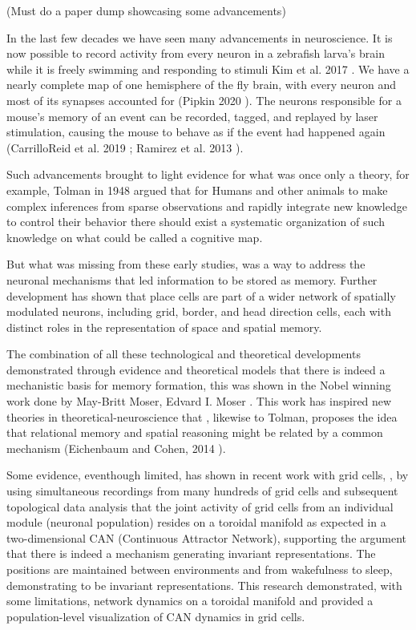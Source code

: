 \documentclass{article}
\begin{document}
(Must do a paper dump showcasing some advancements)

In the last few decades we have seen many advancements in neuroscience. It is now possible to record activity from every neuron in a zebrafish larva’s brain while it is freely swimming and responding to stimuli Kim et al. 2017 \cite{kim2017pan}. We have a nearly complete map of one hemisphere of the fly brain, with every neuron and most of its synapses accounted for (Pipkin 2020 \cite{pipkin2020mapping}). The neurons responsible for a mouse’s memory of an event can be recorded, tagged, and replayed by laser stimulation, causing the mouse to behave as if the event had happened again (CarrilloReid et al. 2019 \cite{carrillo2019controlling}; Ramirez et al. 2013 \cite{ramirez2013creating}).

Such advancements brought to light evidence for what was once only a theory, for example, Tolman in 1948 \cite{tolman1948cognitive} argued that for Humans and other animals to make complex inferences from sparse observations and rapidly integrate new knowledge to control their behavior there should exist a systematic organization of such knowledge on what could be called a cognitive map. 

But what was missing from these early studies, was a way to address the neuronal mechanisms that led information to be stored as memory. Further development has shown that place cells are part of a wider network of spatially modulated neurons, including grid, border, and head direction cells, each with distinct roles in the representation of space and spatial memory.

The combination of all these technological and theoretical developments demonstrated through evidence and theoretical models that there is indeed a mechanistic basis for memory formation, this was shown in the Nobel winning work done by May-Britt Moser, Edvard I. Moser \cite{moser2015place}. This work has inspired new theories in theoretical-neuroscience that , likewise to Tolman, proposes the idea that relational memory and spatial reasoning might be related by a common mechanism (Eichenbaum and Cohen, 2014 \cite{eichenbaum2014can}). 

Some evidence, eventhough limited, has shown in recent work with grid cells, \cite{gardner2022toroidal}, by using simultaneous recordings from many hundreds of grid cells and subsequent topological data analysis that the joint activity of grid cells from an individual module (neuronal population) resides on a toroidal manifold as expected in a two-dimensional CAN (Continuous Attractor Network), supporting the argument that there is indeed a mechanism generating invariant representations. The positions are maintained between environments and from wakefulness to sleep, demonstrating to be invariant representations. This research demonstrated, with some limitations, network dynamics on a toroidal manifold and provided a population-level visualization of CAN dynamics in grid cells.
\end{document}
